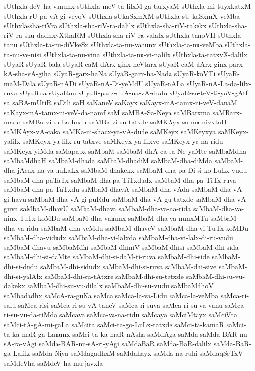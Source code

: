 {sUthxla-deV-ha-vanunx
sUthxla-meV-ta-lilxM-ga-tarxyaM
sUthxla-mi-tuyxkatxM
sUthxla-rU-pa-vA-gi-veyoV
sUthxla-sUkaSxmXM
sUthxla-sU-kaSxmX-veMba
sUthxla-sha-riVra
sUthxla-sha-riV-ra-dalilx
sUthxla-sha-riV-rakekx
sUthxla-sha-riV-ra-shu-dadhxyXthaRM
sUthxla-sha-riV-ra-valalx
sUthxla-tanoVH
sUthxla-tanu
sUthxla-ta-nu-diVkeSx
sUthxla-ta-nu-vanunx
sUthxla-ta-nu-veMba
sUthxla-ta-nu-ve-nisi
sUthxla-ta-nu-vina
sUthxla-ta-nu-vi-nalilx
sUthxla-ta-tatxvX-dalilx
sUyaR
sUyaR-bala
sUyaR-caM-dArx-ginx-neVtarx
sUyaR-caM-dArx-ginx-parx-kA-sha-vA-giha
sUyaR-garx-haNa
sUyaR-garx-ha-Nada
sUyaR-koVTi
sUyaR-maM-Dala
sUyaR-nADi
sUyaR-nA-Di-yeMdU
sUyaR-nALa
sUyaR-nA-La-da-lilx-ruva
sUyaRna
sUyaRnu
sUyaR-parx-dhA-na-vA-dudu
sUyaR-su-teV-ti-yoV-gAtf
sa
saBA-mUtiR
saDili
saH
saKaneV
saKayx
saKayx-mA-tamx-ni-veV-danaM
saKayx-mA-tamx-ni-veV-da-namf
saM
saMBA-Sa-Neya
saMBarxma
saMBarx-mado
saMBa-vi-sa-ba-hudu
saMBa-vi-su-tatxde
saMKAyx-sa-ma-nivxtaH
saMKAyx-vA-caka
saMKa-ni-shacx-ya-vA-dude
saMKeyx
saMKeyxya
saMKeyx-yalilx
saMKeyx-ya-lilx-ru-tatxve
saMKeyx-ya-lilxve
saMKeyx-ya-na-ridu
saMKeyx-yiMda
saMapapx
saMbaM
saMbaM-dhA-ca-ra-Ne-yaMte
saMbaMdha
saMbaMdhaH
saMbaM-dhada
saMbaM-dhadiM
saMbaM-dha-diMda
saMbaM-dha-jAcnx-na-va-nuLaLx
saMbaM-dhakekx
saMbaM-dha-pa-Di-si-ko-LuLx-vudu
saMbaM-dha-paTaTx
saMbaM-dha-pa-TiTxdudx
saMbaM-dha-pa-TiTx-ruva
saMbaM-dha-pa-TuTxdu
saMbaM-dhavA
saMbaM-dha-vAda
saMbaM-dha-vA-gi-havu
saMbaM-dha-vA-gi-puRdu
saMbaM-dha-vA-gu-tatxde
saMbaM-dha-vA-guva
saMbaM-dhavU
saMbaM-dhava
saMbaM-dha-va-na-rida
saMbaM-dha-va-ninx-TuTx-koMDu
saMbaM-dha-vanunx
saMbaM-dha-va-nunxMTu
saMbaM-dha-va-ridu
saMbaM-dha-veMdu
saMbaM-dhaveV
saMbaM-dha-vi-TuTx-koMDu
saMbaM-dha-vidudx
saMbaM-dha-vi-lalxda
saMbaM-dha-vi-lalx-di-ru-vudu
saMbaM-dhavu
saMbaMdhi
saMbaM-dhiniV
saMbaM-dhisi
saMbaM-dhi-sida
saMbaM-dhi-si-daMte
saMbaM-dhi-si-daM-ti-ruva
saMbaM-dhi-side
saMbaM-dhi-si-dudu
saMbaM-dhi-sidudx
saMbaM-dhi-si-ruva
saMbaM-dhi-sive
saMbaM-dhi-si-yalAlx
saMbaM-dhi-su-tAtxre
saMbaM-dhi-su-tatxde
saMbaM-dhi-su-vu-dakekx
saMbaM-dhi-su-vu-dilalx
saMbaM-dhi-su-vudu
saMbaMdhoV
saMbadadhx
saMcA-ra-guNa
saMca
saMca-la-va-Lidu
saMca-la-veMba
saMca-ri-salu
saMca-risi
saMca-ri-su-vA-taneV
saMca-ri-suva
saMca-ri-su-va-vanu
saMca-ri-su-vu-da-riMda
saMcava
saMca-va-na-ridu
saMcaya
saMciMtayx
saMciVta
saMci-tA-gA-mi-gaLa
saMcita
saMci-ta-go-LuLx-tatxde
saMci-ta-kamaR
saMci-ta-ka-maR-ga-Lanunx
saMci-ta-ka-maR-nAsha
saMdAga
saMda
saMda-BAR-nu-sA-ra-vAgi
saMda-BAR-nu-sA-ri-yAgi
saMdaBaR
saMda-BaR-dalilx
saMda-BaR-ga-Lalilx
saMda-Niya
saMdagadhxM
saMdahayx
saMda-na-ruhi
saMdaqSeTxV
saMdeVha
saMdeV-ha-mu-javxla
}

